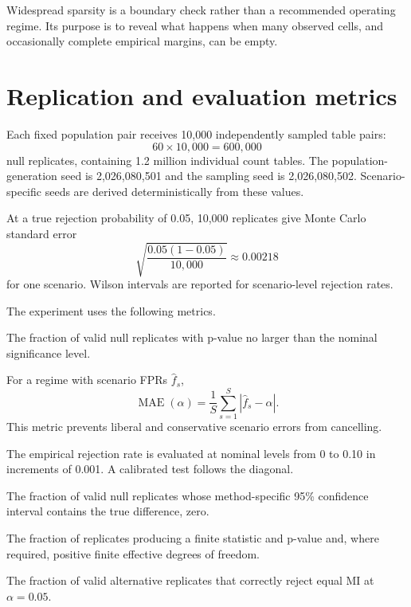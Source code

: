 Widespread sparsity is a boundary check rather than a recommended operating
regime. Its purpose is to reveal what happens when many observed cells, and
occasionally complete empirical margins, can be empty.

\section{Replication and evaluation metrics}

Each fixed population pair receives 10,000 independently sampled table pairs:
\begin{equation}
  60\times10{,}000=600{,}000
\end{equation}
null replicates, containing 1.2 million individual count tables. The
population-generation seed is 2,026,080,501 and the sampling seed is
2,026,080,502. Scenario-specific seeds are derived deterministically from
these values.

At a true rejection probability of 0.05, 10,000 replicates give Monte Carlo
standard error
\begin{equation}
  \sqrt{\frac{0.05(1-0.05)}{10{,}000}}
  \approx0.00218
\end{equation}
for one scenario. Wilson intervals are reported for scenario-level rejection
rates.

The experiment uses the following metrics.

\begin{description}[style=nextline,leftmargin=34mm,labelwidth=32mm]
  \item[False-positive rate.]
  The fraction of valid null replicates with p-value no larger than the nominal
  significance level.

  \item[Mean absolute calibration error.]
  For a regime with scenario FPRs \(\widehat f_s\),
  \begin{equation}
    \operatorname{MAE}(\alpha)
    =\frac{1}{S}\sum_{s=1}^{S}|\widehat f_s-\alpha|.
  \end{equation}
  This metric prevents liberal and conservative scenario errors from
  cancelling.

  \item[Rejection-calibration curve.]
  The empirical rejection rate is evaluated at nominal levels from 0 to 0.10
  in increments of 0.001. A calibrated test follows the diagonal.

  \item[Coverage.]
  The fraction of valid null replicates whose method-specific 95\% confidence
  interval contains the true difference, zero.

  \item[Valid rate.]
  The fraction of replicates producing a finite statistic and p-value and,
  where required, positive finite effective degrees of freedom.

  \item[Power.]
  The fraction of valid alternative replicates that correctly reject equal MI
  at \(\alpha=0.05\).
\end{description}

